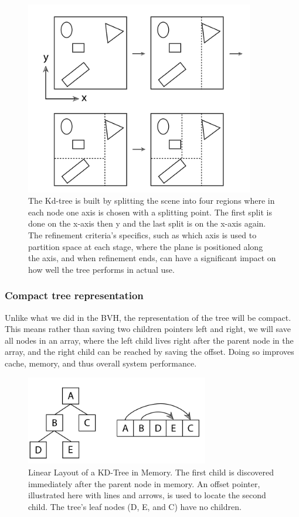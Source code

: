 \documentclass[11pt,a4paper]{article}
\begin{document}
\begin{figure}[h]	
     \centering
     \captionsetup{justification=centering,margin=2cm}
     \includegraphics[width=10cm]{images/kdtree/example_demo.png}
     \caption{The Kd-tree is built by splitting the scene into four regions where in each node one axis is chosen with a splitting point.  The first split is done on the x-axis then y and the last split is on the x-axis again. The refinement criteria's specifics, such as which axis is used to partition space at each stage, where the plane is positioned along the axis, and when refinement ends, can have a significant impact on how well the tree performs in actual use. \protect\cite{Pharr2016}}
        \label{fig:dice}
\end{figure}



\subsubsection{Compact tree representation}
Unlike what we did in the BVH, the representation of the tree will be compact. This means rather than saving two children pointers left and right, we will save all nodes in an array, where the left child lives right after the parent node in the array, and the right child can be reached by saving the offset. Doing so improves cache, memory, and thus overall system performance.


\begin{figure}[h]	
     \centering
     \captionsetup{justification=centering,margin=2cm}
     \includegraphics[width=8cm]{images/kdtree/compact.png}
     \caption{Linear Layout of a KD-Tree in Memory. The  first child is discovered immediately after the parent node in memory. An offset pointer, illustrated here with lines and arrows, is used to locate the second child. The tree's leaf nodes (D, E, and C) have no children.\protect\cite{Pharr2016}}
        \label{fig:dice}
\end{figure}
\end{document}
